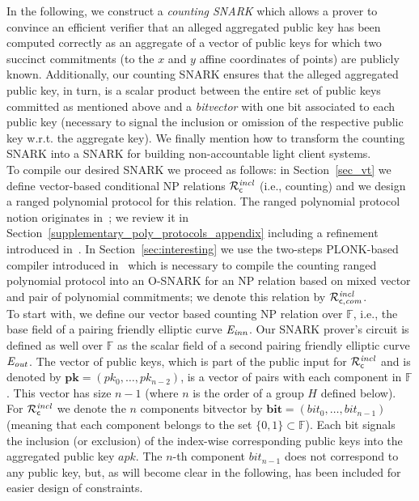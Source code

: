 In the following, we construct a \emph{counting SNARK} which allows a prover to convince an efficient verifier that an alleged 
aggregated public key has been computed correctly as an aggregate of a vector of public keys for which 
two succinct commitments (to the $x$ and $y$ affine coordinates of points) are publicly known. Additionally, our counting 
SNARK ensures that the alleged aggregated public key, in turn, is a scalar product between the entire set of public keys 
committed as mentioned above and a \emph{bitvector} with one bit associated to each public key 
(necessary to signal the inclusion or omission of the respective public key w.r.t. the aggregate key).  
We finally mention how to transform the counting SNARK into a SNARK for building non-accountable light client systems. \\

\noindent To compile our desired SNARK we proceed as follows: in 
Section~\ref{sec_vt} we define vector-based conditional NP relations $\mathcal{R}^{\mathit{incl}}_{\mathsf{c}}$ (i.e., counting) and we design a 
ranged polynomial protocol for this relation. The ranged polynomial protocol notion originates in~\cite{plonk}; 
we review it in Section~\ref{supplementary_poly_protocols_appendix} including a refinement introduced in~\cite{LC_paper}.  
In Section~\ref{sec:interesting} we use the two-steps PLONK-based compiler introduced in~\cite{LC_paper} which is necessary to compile the counting 
ranged polynomial protocol into an O-SNARK for an NP relation based on mixed vector and pair of polynomial commitments; 
we denote this relation by $\mathcal{R}^{\mathit{incl}}_{\mathsf{c},\mathit{com}}$. \\

\noindent To start with, we define our vector based counting NP relation over $\mathbb{F}$, i.e., the base field of a pairing friendly 
elliptic curve $\mathit{E}_{\mathit{inn}}$. Our SNARK prover's circuit is defined as well over $\mathbb{F}$ as the scalar field of a second pairing friendly elliptic 
curve $\mathit{E}_{\mathit{out}}$. The vector of public keys, which is part of the public input for $\mathcal{R}^{\mathit{incl}}_{\mathsf{c}}$ and is denoted by 
$\mathbf{pk} = (\mathit{pk_0}, \ldots, \mathit{pk_{n-2}})$, is a vector of pairs with each component in $\mathbb{F}$. 
This vector has size $n-1$ (where $n$ is the order of a group $H$ defined below). For $\mathcal{R}^{\mathit{incl}}_{\mathsf{c}}$ we denote 
the $n$ components bitvector by $\mathbf{bit} = (\mathit{bit_0}, \ldots, \mathit{bit_{n-1}})$ 
(meaning that each component belongs to the set $\{0,1\} \subset \mathbb{F}$). 
Each bit signals the inclusion (or exclusion) of the index-wise corresponding public keys 
into the aggregated public key $\mathit{apk}$. The $n$-th component $\mathit{bit_{n-1}}$ does not correspond to any public key, 
but, as will become clear in the following, has been included for easier design of constraints. \\ 


